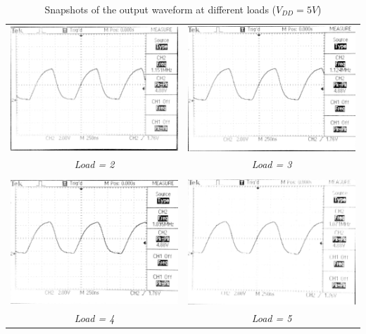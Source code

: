 \documentclass[a4paper, 11pt]{article}
\begin{document}
\begin{table}[H]
\centering 
  \begin{tabular}{ c  c }
      \includegraphics[width=2.5in]{EE214_1.jpg} & \includegraphics[width=2.5in]{EE214_2.jpg} \\
      \em Load = 2 & \em Load = 3 \\
         & \\
      \includegraphics[width=2.5in]{EE214_3.jpg} & \includegraphics[width=2.5in]{EE214_4.jpg} \\
      \em Load = 4 & \em Load = 5 \\
  \end{tabular}
 \caption{Snapshots of the output waveform at different loads ($V_{DD} = 5V$)}
 
\end{table}
\end{document}
